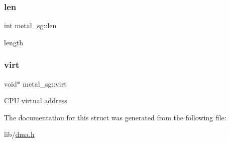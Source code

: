 \subsubsection{\texorpdfstring{len}{len}}
{\footnotesize\ttfamily int metal\+\_\+sg\+::len}

length \mbox{\label{structmetal__sg_a9db82b2b09bffaa793c0293c9d02faed}} 
\subsubsection{\texorpdfstring{virt}{virt}}
{\footnotesize\ttfamily void$\ast$ metal\+\_\+sg\+::virt}

C\+PU virtual address 

The documentation for this struct was generated from the following file\+:\begin{DoxyCompactItemize}
\item 
lib/\hyperlink{dma_8h}{dma.\+h}\end{DoxyCompactItemize}
